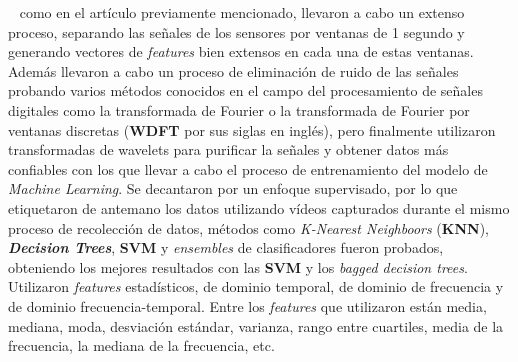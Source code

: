 		~ como en el artículo previamente mencionado, llevaron a cabo un extenso proceso, separando las señales de los
		sensores por ventanas de 1 segundo y generando vectores de \emph{features} bien extensos en cada una de estas ventanas. Además llevaron
		a cabo un proceso de eliminación de ruido de las señales probando varios métodos conocidos en el campo del procesamiento de señales
		digitales como la transformada de Fourier o la transformada de Fourier por ventanas discretas (\textbf{WDFT} por sus siglas en inglés),
		pero finalmente utilizaron transformadas de wavelets para purificar la señales y obtener datos más confiables con los que llevar a cabo
		el proceso de entrenamiento del modelo de \emph{Machine Learning}. Se decantaron por un enfoque supervisado, por lo que etiquetaron de
		antemano los datos utilizando vídeos capturados durante el mismo proceso de recolección de datos, métodos como \emph{K-Nearest Neighboors}
		(\textbf{KNN}), \emph{\textbf{Decision Trees}}, \textbf{SVM} y \emph{ensembles} de clasificadores fueron probados, obteniendo los mejores
		resultados con las \textbf{SVM} y los \emph{bagged decision trees}. Utilizaron \emph{features} estadísticos, de dominio temporal, de dominio
		de frecuencia y de dominio frecuencia-temporal. Entre los \emph{features} que utilizaron están media, mediana, moda, desviación estándar,
		varianza, rango entre cuartiles, media de la frecuencia, la mediana de la frecuencia, etc.\\



